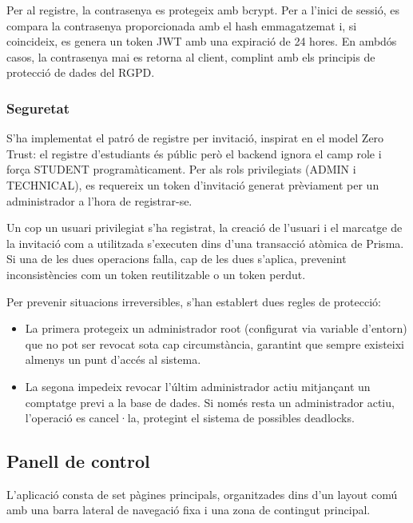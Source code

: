 \documentclass[10pt,a4paper,twocolumn,twoside]{article}
\begin{document}
		Per al registre, la contrasenya es protegeix amb bcrypt. Per a
		l'inici de sessió, es compara la contrasenya proporcionada amb el hash
		emmagatzemat i, si coincideix, es genera un token JWT amb una expiració de
		24 hores. En ambdós casos, la contrasenya mai es retorna al client, complint
		amb els principis de protecció de dades del RGPD.
		
		\subsubsection{Seguretat}
		
		S'ha implementat el patró de registre per invitació, inspirat en el model
		Zero Trust: el registre d'estudiants és públic però el backend ignora el
		camp role i força STUDENT programàticament. Per als rols privilegiats (ADMIN
		i TECHNICAL), es requereix un token d'invitació generat prèviament per un
		administrador a l'hora de registrar-se.
		
		Un cop un usuari privilegiat s'ha registrat, la creació de l'usuari i el marcatge de la invitació com a
		utilitzada s'executen dins d'una transacció atòmica de Prisma. Si una de les
		dues operacions falla, cap de les dues s'aplica, prevenint inconsistències
		com un token reutilitzable o un token perdut.
		
		Per prevenir situacions irreversibles, s'han establert dues regles de
		protecció: 
		
		\begin{itemize}
			\item La primera protegeix un administrador root (configurat via variable d'entorn)
			que no pot ser revocat sota cap circumstància, garantint que sempre existeixi
			almenys un punt d'accés al sistema.
			
			\item La segona impedeix revocar l'últim administrador actiu mitjançant un comptatge
			previ a la base de dades. Si només resta un administrador actiu, l'operació
			es cancel·la, protegint el sistema de possibles deadlocks.
			
		\end{itemize}
		
		\subsection{Panell de control}
		
		L'aplicació consta de set pàgines principals, organitzades dins d'un layout
		comú amb una barra lateral de navegació fixa i una zona de contingut principal.
		
\end{document}
